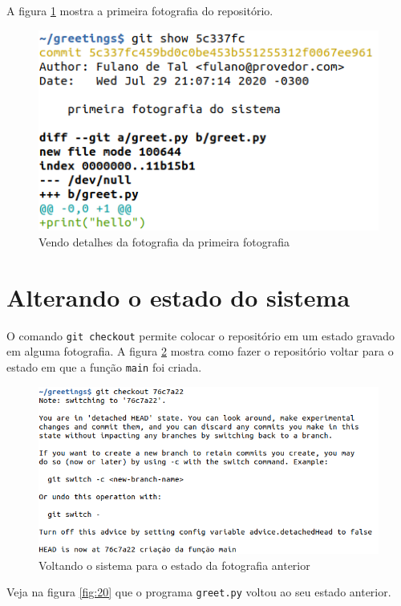 \documentclass[a4paper]{book}
\begin{document}
A figura \ref{fig:17} mostra a primeira fotografia do repositório.

\begin{figure}[ht]
\caption{Vendo detalhes da fotografia da primeira fotografia}
\label{fig:17}
\centering
\includegraphics[scale=0.6]{"images/17-Vendo detalhes da fotografia da primeira fotografia.png"}
\end{figure}

\newpage
\section{Alterando o estado do sistema}

O comando \texttt{git checkout} permite colocar o repositório
em um estado gravado em alguma fotografia. 
A figura \ref{fig:18} mostra como fazer o repositório
voltar para o estado em que a função \texttt{main}
foi criada.

\begin{figure}[ht]
\caption{Voltando o sistema para o estado da fotografia anterior}
\label{fig:18}
\centering
\includegraphics[scale=0.6]{"images/18-Voltando o sistema para o estado da fotografia anterior.png"}
\end{figure}

Veja na figura \ref{fig:20} que o programa \texttt{greet.py}
voltou ao seu estado anterior.
\end{document}
